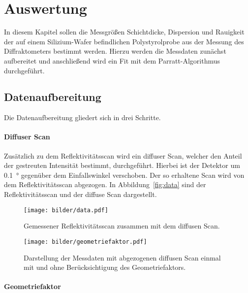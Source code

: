 

\section{Auswertung}

In diesem Kapitel sollen die Messgrößen Schichtdicke, Dispersion und Rauigkeit
der auf einem Silizium-Wafer befindlichen Polystyrolprobe aus der Messung des
Diffraktometers bestimmt werden.
Hierzu werden die Messdaten zunächst aufbereitet und anschließend wird ein Fit
mit dem Parratt-Algorithmus durchgeführt.

\subsection{Datenaufbereitung}
\label{sub:datenaufbereitung}

Die Datenaufbereitung gliedert sich in drei Schritte.

\paragraph{Diffuser Scan}
\label{par:diffuser_scan}

Zusätzlich zu dem Reflektivitätsscan wird ein diffuser Scan, welcher den Anteil
der gestreuten Intensität bestimmt, durchgeführt.
Hierbei ist der Detektor um \SI{0.1}{\degree} gegenüber dem Einfallswinkel
verschoben. Der so erhaltene Scan wird von dem Reflektivitätsscan abgezogen.
In Abbildung~\ref{fig:data} sind der Reflektivitätsscan und der diffuse Scan
dargestellt.

\begin{figure}[htpb]
  \centering
  \texttt{[image: bilder/data.pdf]}
  \caption{Gemessener Reflektivitätsscan zusammen mit dem diffusen Scan.}
\label{fig:data}
  \texttt{[image: bilder/geometriefaktor.pdf]}
  \caption{Darstellung der Messdaten mit abgezogenen diffusen Scan einmal mit
    und ohne Berücksichtigung des Geometriefaktors.}
\label{fig:geometriefaktor}
\end{figure}

\paragraph{Geometriefaktor}
\label{par:geometriefaktor}

